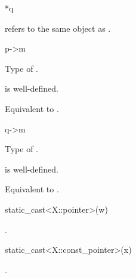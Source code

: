 \begin{itemdescr}
\pnum
\result
{}
\end{itemdescr}

\begin{itemdecl}
*q
\end{itemdecl}

\begin{itemdescr}
\pnum
\result
{}

\pnum
\ensures
{} refers to the same object as .
\end{itemdescr}

\begin{itemdecl}
p->m
\end{itemdecl}

\begin{itemdescr}
\pnum
\result
Type of .

\pnum
\expects
{} is well-defined.

\pnum
\effects
Equivalent to .
\end{itemdescr}

\begin{itemdecl}
q->m
\end{itemdecl}

\begin{itemdescr}
\pnum
\result
Type of .

\pnum
\expects
{} is well-defined.

\pnum
\effects
Equivalent to .
\end{itemdescr}

\begin{itemdecl}
static_cast<X::pointer>(w)
\end{itemdecl}

\begin{itemdescr}
\pnum
\result
{}

\pnum
\ensures
{}.
\end{itemdescr}

\begin{itemdecl}
static_cast<X::const_pointer>(x)
\end{itemdecl}

\begin{itemdescr}
\pnum
\result
{}

\pnum
\ensures
{}.
\end{itemdescr}

